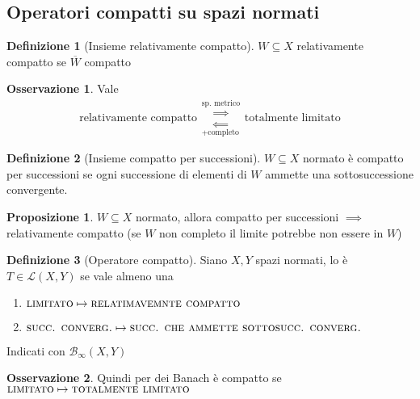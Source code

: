 \documentclass[a4paper,10pt]{article}
\theoremstyle{definition}
\newcommand{\noun}[1]{\textsc{#1}}
\theoremstyle{indentdefinition}
\newtheorem{defn}{Definizione}[section]
\theoremstyle{indenttheorem}
\newtheorem{prop}{Proposizione}
\theoremstyle{myremark}
\newtheorem*{rem*}{Osservazione}
\theoremstyle{indentgeneral}
\begin{document}
\subsection{Operatori compatti su spazi normati}
\begin{defn}[Insieme relativamente compatto]
    $W\subseteq X$ relativamente compatto se $\overline{W}$ compatto
\end{defn}

\begin{rem*}
    Vale
    $$\text{relativamente compatto} \begin{array}{c}
         \overset{\text{sp. metrico}}{\implies}  \\
         \underset{+\text{completo}}{\impliedby}
    \end{array}\text{totalmente limitato}$$
\end{rem*}
\begin{defn}[Insieme compatto per successioni]
    $W\subseteq X$ normato è compatto per successioni se ogni successione di elementi di $W$ ammette una sottosuccessione convergente.
\end{defn}

\begin{prop}
     $W\subseteq X$ normato, allora compatto per successioni $\implies$ relativamente compatto (se $W$ non completo il limite potrebbe non essere in $W$)
\end{prop}

\begin{defn}[Operatore compatto]
    Siano $X,Y$ spazi  normati, lo è $T\in\mathcal{L}(X,Y)$ se vale almeno una
    \begin{enumerate}
        \item $\noun{limitato}\mapsto\noun{relatimavemnte compatto}$
         \item $\noun{succ. converg.}\mapsto\noun{succ. che ammette sottosucc. converg.}$
    \end{enumerate}
    Indicati con $\mathcal{B}_\infty(X,Y)$
\end{defn}

\begin{rem*}
    Quindi per dei Banach è compatto se $\noun{limitato}\mapsto\noun{totalmente limitato}$
\end{rem*}
\end{document}
